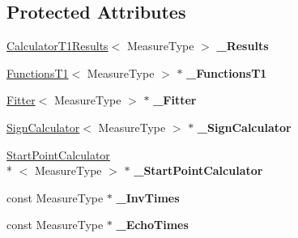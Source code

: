 \subsection*{Protected Attributes}
\begin{DoxyCompactItemize}
\item 
\hypertarget{class_ox_1_1_calculator_t1_afa4db4321ca3013a14bcbafbf2d6413a}{\hyperlink{struct_ox_1_1_calculator_t1_results}{Calculator\-T1\-Results}$<$ Measure\-Type $>$ {\bfseries \-\_\-\-Results}}\label{class_ox_1_1_calculator_t1_afa4db4321ca3013a14bcbafbf2d6413a}

\item 
\hypertarget{class_ox_1_1_calculator_t1_a3ad93308f17209680d93b727a90a23ee}{\hyperlink{class_ox_1_1_functions_t1}{Functions\-T1}$<$ Measure\-Type $>$ $\ast$ {\bfseries \-\_\-\-Functions\-T1}}\label{class_ox_1_1_calculator_t1_a3ad93308f17209680d93b727a90a23ee}

\item 
\hypertarget{class_ox_1_1_calculator_t1_a4863afe5f79555d5c6c31f6726d18578}{\hyperlink{class_ox_1_1_fitter}{Fitter}$<$ Measure\-Type $>$ $\ast$ {\bfseries \-\_\-\-Fitter}}\label{class_ox_1_1_calculator_t1_a4863afe5f79555d5c6c31f6726d18578}

\item 
\hypertarget{class_ox_1_1_calculator_t1_a6408fb35f4aeb4793bef57b491f8fa89}{\hyperlink{class_ox_1_1_sign_calculator}{Sign\-Calculator}$<$ Measure\-Type $>$ $\ast$ {\bfseries \-\_\-\-Sign\-Calculator}}\label{class_ox_1_1_calculator_t1_a6408fb35f4aeb4793bef57b491f8fa89}

\item 
\hypertarget{class_ox_1_1_calculator_t1_a6487bcc203c83566702a12a382ebe97f}{\hyperlink{class_ox_1_1_start_point_calculator}{Start\-Point\-Calculator}\\*
$<$ Measure\-Type $>$ $\ast$ {\bfseries \-\_\-\-Start\-Point\-Calculator}}\label{class_ox_1_1_calculator_t1_a6487bcc203c83566702a12a382ebe97f}

\item 
\hypertarget{class_ox_1_1_calculator_t1_ad97a2f1d28c9ffb68b9aa1f50bf85553}{const Measure\-Type $\ast$ {\bfseries \-\_\-\-Inv\-Times}}\label{class_ox_1_1_calculator_t1_ad97a2f1d28c9ffb68b9aa1f50bf85553}

\item 
\hypertarget{class_ox_1_1_calculator_t1_ab8d0c95f394ec1c5c0d765ae2c89df71}{const Measure\-Type $\ast$ {\bfseries \-\_\-\-Echo\-Times}}\label{class_ox_1_1_calculator_t1_ab8d0c95f394ec1c5c0d765ae2c89df71}


\end{DoxyCompactItemize}
